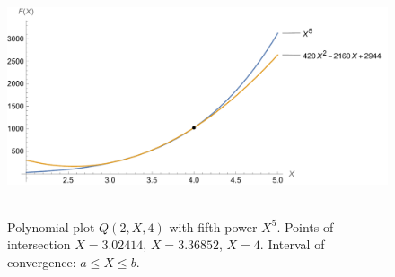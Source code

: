 ﻿\begin{figure}[H]
    \centering
    \includegraphics[width=1\textwidth]{sections/images/04_plots_polynomial_q2_n4_with_fifth}
    ~\caption{Polynomial plot $Q(2, X, 4)$ with fifth power $X^5$.
    Points of intersection $X=3.02414$, $X=3.36852$, $X=4$.
    Interval of convergence: $a \leq X \leq b$.
    }\label{fig:figure10}
\end{figure}
